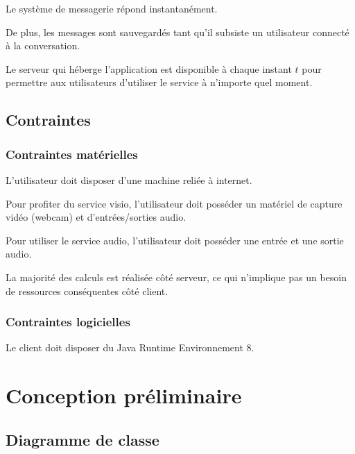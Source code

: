 \documentclass[11pt,dvipsnames,svgnames]{report}
\begin{document}
Le système de messagerie répond instantanément.

De plus, les messages sont sauvegardés tant qu'il subsiste un utilisateur connecté à la conversation.

Le serveur qui héberge l'application est disponible à chaque instant $t$ pour permettre aux utilisateurs d'utiliser le service à n'importe quel moment.

\section{Contraintes}
\subsection{Contraintes matérielles}
L'utilisateur doit disposer d'une machine reliée à internet.

Pour profiter du service visio, l'utilisateur doit posséder un matériel de capture vidéo (webcam) et d'entrées/sorties audio.

Pour utiliser le service audio, l'utilisateur doit posséder une entrée et une sortie audio.

La majorité des calculs est réalisée côté serveur, ce qui n'implique pas un besoin de ressources conséquentes côté client.

\subsection{Contraintes logicielles}

Le client doit disposer du Java Runtime Environnement 8.

\chapter{Conception préliminaire}

\section{Diagramme de classe}
\end{document}
